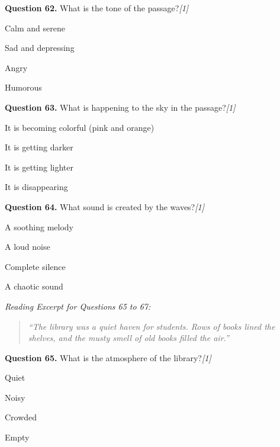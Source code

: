 \documentclass[11pt,a4paper]{article}
\newcommand{\pts}[1]{\hfill   \textit{[#1]}}
\begin{document}
\noindent   \textbf{Question 62.} What is the tone of the passage?\pts{1}

\begin{parts}
  \item Calm and serene
  \item Sad and depressing
  \item Angry
  \item Humorous
\end{parts}

\medskip




\noindent   \textbf{Question 63.} What is happening to the sky in the passage?\pts{1}

\begin{parts}
  \item It is becoming colorful (pink and orange)
  \item It is getting darker
  \item It is getting lighter
  \item It is disappearing
\end{parts}

\medskip




\noindent   \textbf{Question 64.} What sound is created by the waves?\pts{1}

\begin{parts}
  \item A soothing melody
  \item A loud noise
  \item Complete silence
  \item A chaotic sound
\end{parts}

\bigskip



\noindent   \textit{Reading Excerpt for Questions 65 to 67:}

\begin{quote}
   \textit{``The library was a quiet haven for students. Rows of books lined the shelves, and the musty smell of old books filled the air.''}
\end{quote}
\smallskip




\noindent   \textbf{Question 65.} What is the atmosphere of the library?\pts{1}

\begin{parts}
  \item Quiet
  \item Noisy
  \item Crowded
  \item Empty
\end{parts}
\end{document}
